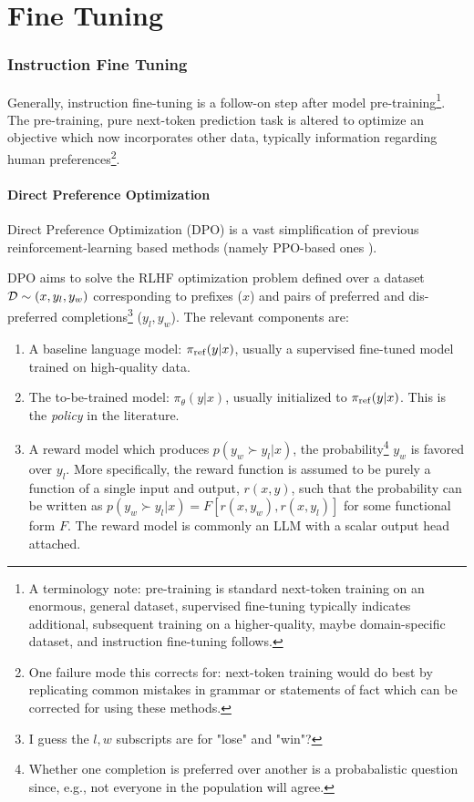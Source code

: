 \part{Fine Tuning}

\section{Instruction Fine Tuning}

Generally, instruction fine-tuning is a follow-on step after model pre-training\footnote{A
terminology note: pre-training is standard next-token training on an enormous, general dataset, supervised
fine-tuning typically indicates additional, subsequent training on a higher-quality, maybe
domain-specific dataset, and instruction fine-tuning follows.}.
The pre-training, pure next-token prediction task is altered to optimize an objective which now
incorporates other data, typically information regarding human preferences\footnote{One failure mode
this corrects for: next-token training would do best by replicating common mistakes in grammar or
statements of fact which can be corrected for using these methods.}.


\subsection{Direct Preference Optimization}

Direct Preference Optimization (DPO) \cite{rafailov2024directpreferenceoptimizationlanguage} is a
vast simplification of previous reinforcement-learning based methods (namely PPO-based ones
\cite{schulman2017proximalpolicyoptimizationalgorithms}).


DPO aims to solve the RLHF optimization problem defined over a dataset $\mathcal{D} \sim  (x, y _{ l }, y
_{ w }) $ corresponding to prefixes ($ x $) and pairs of preferred and dis-preferred
completions\footnote{I guess the $ l, w $ subscripts are for "lose" and "win"?} ($ y _{ l }, y _{ w
} $). The relevant components are:
\begin{enumerate}
    \item A baseline language model: $ \pi _{ {\rm  ref} } (y|x)$, usually a supervised fine-tuned
        model trained on high-quality data.
    \item The to-be-trained model: $ \pi _{\theta } (y|x)$, usually initialized to $ \pi _{ {\rm
        ref} } (y|x)$. This is the \textit{policy} in the literature.
    \item A reward model which produces $ p(y _{ w } \succ y _{ l }| x ) $, the
        probability\footnote{Whether one completion is preferred over another is a probabalistic
        question since, e.g., not everyone in the population will agree.} $ y _{ w } $ is favored
        over $ y _{ l } $.  More specifically, the reward function is assumed to be purely a function
        of a single input and output, $ r(x, y) $, such that the probability can be written as $ p(y
        _{ w } \succ y _{ l }| x ) = F[r(x, y _{ w }), r(x, y _{ l })] $ for some functional form $
        F $. The reward model is commonly an LLM with a scalar output head attached.
\end{enumerate}


